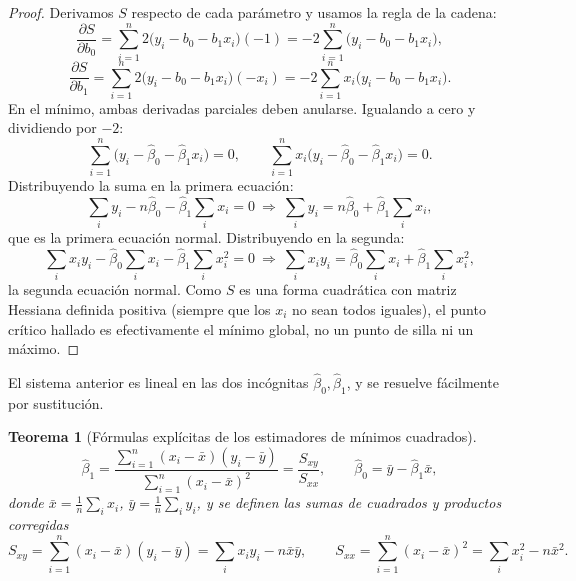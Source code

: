 \documentclass[11pt,a4paper]{article}
\theoremstyle{plain}
\newtheorem{teorema}{Teorema}[section]
\theoremstyle{definition}
\theoremstyle{remark}
\begin{document}
\begin{proof}
Derivamos $S$ respecto de cada parámetro y usamos la regla de la cadena:
\[
\frac{\partial S}{\partial b_0} = \sum_{i=1}^n 2\big(y_i-b_0-b_1x_i\big)(-1) = -2\sum_{i=1}^n \big(y_i-b_0-b_1x_i\big),
\]
\[
\frac{\partial S}{\partial b_1} = \sum_{i=1}^n 2\big(y_i-b_0-b_1x_i\big)(-x_i) = -2\sum_{i=1}^n x_i\big(y_i-b_0-b_1x_i\big).
\]
En el mínimo, ambas derivadas parciales deben anularse. Igualando a cero y dividiendo por $-2$:
\[
\sum_{i=1}^n \big(y_i-\hat\beta_0-\hat\beta_1x_i\big) = 0, \qquad \sum_{i=1}^n x_i\big(y_i-\hat\beta_0-\hat\beta_1x_i\big) = 0.
\]
Distribuyendo la suma en la primera ecuación:
\[
\sum_i y_i - n\hat\beta_0 - \hat\beta_1\sum_i x_i = 0 \ \Longrightarrow\ \sum_i y_i = n\hat\beta_0+\hat\beta_1\sum_i x_i,
\]
que es la primera ecuación normal. Distribuyendo en la segunda:
\[
\sum_i x_iy_i - \hat\beta_0\sum_i x_i - \hat\beta_1 \sum_i x_i^2 = 0 \ \Longrightarrow\ \sum_i x_iy_i = \hat\beta_0\sum_i x_i + \hat\beta_1\sum_i x_i^2,
\]
la segunda ecuación normal. Como $S$ es una forma cuadrática con matriz Hessiana definida positiva (siempre que los $x_i$ no sean todos iguales), el punto crítico hallado es efectivamente el mínimo global, no un punto de silla ni un máximo.
\end{proof}

El sistema anterior es lineal en las dos incógnitas $\hat\beta_0,\hat\beta_1$, y se resuelve fácilmente por sustitución.

\begin{teorema}[Fórmulas explícitas de los estimadores de mínimos cuadrados]
\[
\hat\beta_1 = \frac{\displaystyle\sum_{i=1}^n (x_i-\bar x)(y_i-\bar y)}{\displaystyle\sum_{i=1}^n (x_i-\bar x)^2} = \frac{S_{xy}}{S_{xx}}, \qquad \hat\beta_0 = \bar y - \hat\beta_1 \bar x,
\]
donde $\bar x=\frac1n\sum_i x_i$, $\bar y=\frac1n\sum_i y_i$, y se definen las sumas de cuadrados y productos corregidas
\[
S_{xy} = \sum_{i=1}^n (x_i-\bar x)(y_i-\bar y) = \sum_i x_iy_i - n\bar x\bar y, \qquad S_{xx} = \sum_{i=1}^n (x_i-\bar x)^2 = \sum_i x_i^2 - n\bar x^2.
\]
\end{teorema}
\end{document}
